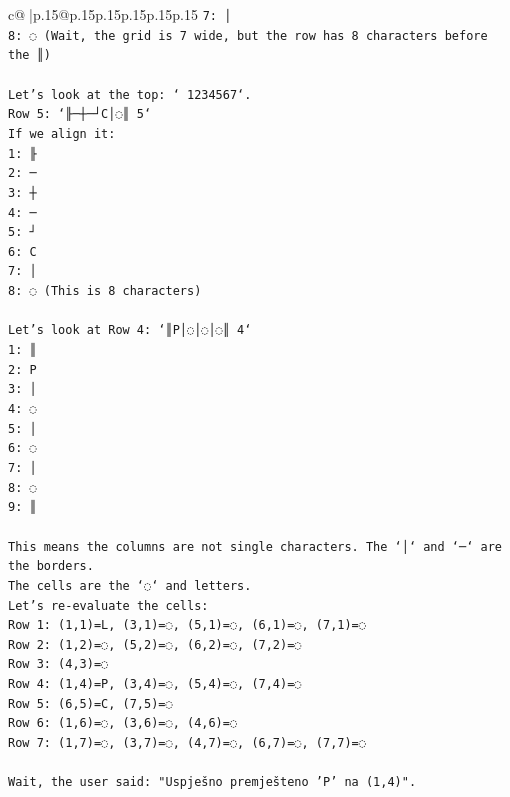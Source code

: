 \documentclass{article}
\begin{document}
{\begin{supertabular}{c@{$\;$}|p{.15\linewidth}@{}p{.15\linewidth}p{.15\linewidth}p{.15\linewidth}p{.15\linewidth}p{.15\linewidth}}
{{{\texttt{7: │} \\
\texttt{8: ◌ (Wait, the grid is 7 wide, but the row has 8 characters before the ║)} \\
\\ 
\texttt{Let's look at the top: ` 1234567`.} \\
\texttt{Row 5: `╟─┼─┘C│◌║ 5`} \\
\texttt{If we align it:} \\
\texttt{1: ╟} \\
\texttt{2: ─} \\
\texttt{3: ┼} \\
\texttt{4: ─} \\
\texttt{5: ┘} \\
\texttt{6: C} \\
\texttt{7: │} \\
\texttt{8: ◌ (This is 8 characters)} \\
\\ 
\texttt{Let's look at Row 4: `║P│◌│◌│◌║ 4`} \\
\texttt{1: ║} \\
\texttt{2: P} \\
\texttt{3: │} \\
\texttt{4: ◌} \\
\texttt{5: │} \\
\texttt{6: ◌} \\
\texttt{7: │} \\
\texttt{8: ◌} \\
\texttt{9: ║} \\
\\ 
\texttt{This means the columns are not single characters. The `│` and `─` are the borders.} \\
\texttt{The cells are the `◌` and letters.} \\
\texttt{Let's re{-}evaluate the cells:} \\
\texttt{Row 1: (1,1)=L, (3,1)=◌, (5,1)=◌, (6,1)=◌, (7,1)=◌} \\
\texttt{Row 2: (1,2)=◌, (5,2)=◌, (6,2)=◌, (7,2)=◌} \\
\texttt{Row 3: (4,3)=◌} \\
\texttt{Row 4: (1,4)=P, (3,4)=◌, (5,4)=◌, (7,4)=◌} \\
\texttt{Row 5: (6,5)=C, (7,5)=◌} \\
\texttt{Row 6: (1,6)=◌, (3,6)=◌, (4,6)=◌} \\
\texttt{Row 7: (1,7)=◌, (3,7)=◌, (4,7)=◌, (6,7)=◌, (7,7)=◌} \\
\\ 
\texttt{Wait, the user said: "Uspješno premješteno 'P' na (1,4)".} \\
}}}
\end{supertabular}}
\end{document}
